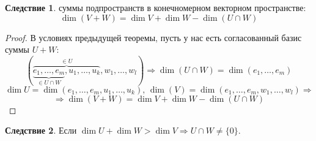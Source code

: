 \documentclass[12pt]{article}
\theoremstyle{definition}
\newtheorem{corollary}{Следствие}
\begin{document}
\begin{corollary}
	 суммы подпространств в конечномерном векторном пространстве:
	$$
		\dim{(V + W)} = \dim{V} + \dim{W} - \dim{(U \cap W)}
	$$
\end{corollary}
\begin{proof}
	В условиях предыдущей теоремы, пусть у нас есть согласованный базис суммы $U + W$:
	$$
		(\overbrace{\underbrace{e_1, \dotsc, e_m}_{\in U \cap W}, u_1, \dotsc, u_k}^{\in U}, w_1, \dotsc, w_l)	\Rightarrow \dim{(U\cap W)} = \dim{(e_1, \dotsc, e_m)}
	$$
	$$
		\dim{U} = \dim{(e_1, \dotsc, e_m, u_1, \dotsc, u_k)}, \, \dim{(V)} = \dim{(e_1, \dotsc, e_m, w_1, \dotsc, w_l)} \Rightarrow
	$$
	$$
		\Rightarrow \dim{(V + W)} = \dim{V} + \dim{W} -  \dim{(U \cap W)}
	$$
\end{proof}
\begin{corollary}
	Если $\dim{U} + \dim{W} > \dim{V} \Rightarrow U \cap W \neq \{0\}$.
\end{corollary}
\end{document}
